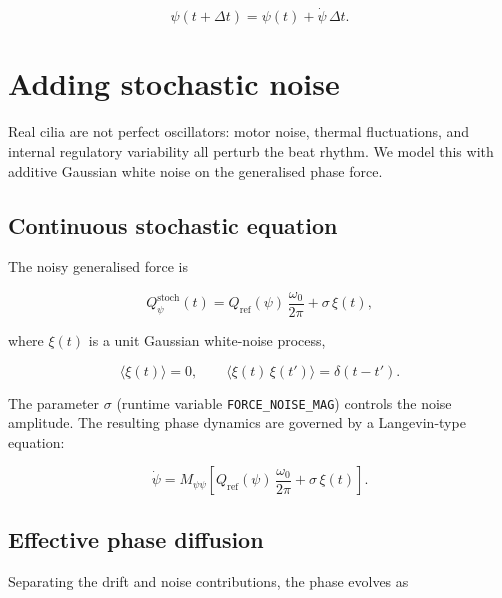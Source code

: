 \documentclass[11pt,a4paper]{article}
\newcommand{\DT}{\Delta t}
\begin{document}
\begin{equation}
  \psi(t+\DT) = \psi(t) + \dot\psi\,\DT.
  \label{eq:phase_det_update}
\end{equation}

\section{Adding stochastic noise}

Real cilia are not perfect oscillators: motor noise, thermal fluctuations, and
internal regulatory variability all perturb the beat rhythm.  We model this
with additive Gaussian white noise on the generalised phase force.

\subsection{Continuous stochastic equation}

The noisy generalised force is

\begin{equation}
  Q_\psi^{\text{stoch}}(t) = Q_{\text{ref}}(\psi)\,\frac{\omega_0}{2\pi}
    + \sigma\,\xi(t),
  \label{eq:qphase_stoch}
\end{equation}

where $\xi(t)$ is a unit Gaussian white-noise process,

\begin{equation}
  \langle\xi(t)\rangle = 0, \qquad
  \langle\xi(t)\,\xi(t')\rangle = \delta(t-t').
\end{equation}

The parameter $\sigma$ (runtime variable \texttt{FORCE\_NOISE\_MAG}) controls
the noise amplitude.  The resulting phase dynamics are governed by a
Langevin-type equation:

\begin{equation}
  \dot\psi = M_{\psi\psi}\!\left[Q_{\text{ref}}(\psi)\,\frac{\omega_0}{2\pi}
    + \sigma\,\xi(t)\right].
  \label{eq:langevin_phase}
\end{equation}

\subsection{Effective phase diffusion}

Separating the drift and noise contributions, the phase evolves as
\end{document}

